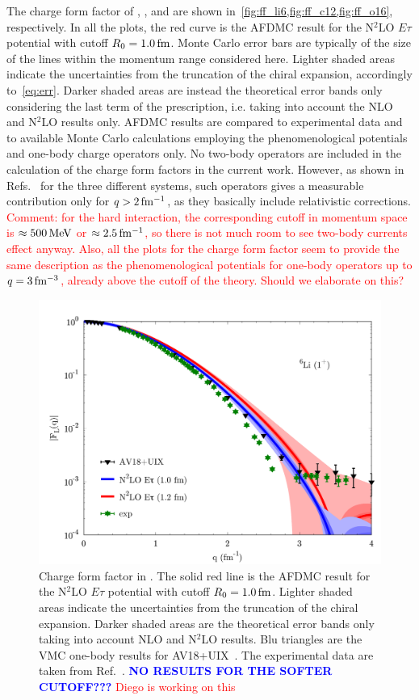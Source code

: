 \documentclass[aps,prc,twocolumn,superscriptaddress,showpacs,floatfix,nofootinbib]{revtex4-1}
\newcommand{\red}[1]{\protect\textcolor{red}{#1}}
\newcommand{\blue}[1]{\protect\textcolor{blue}{#1}}
\begin{document}
The charge form factor of , , and  are shown 
in~\cref{fig:ff_li6,fig:ff_c12,fig:ff_o16}, respectively. In all the plots, the red curve
is the AFDMC result for the N$^2$LO $E\tau$ potential with cutoff $R_0=1.0\,\rm fm$.
Monte Carlo error bars are typically of the size of the lines within the momentum 
range considered here. Lighter shaded areas indicate the uncertainties from 
the truncation of the chiral expansion, accordingly to~\cref{eq:err}.
Darker shaded areas are instead the theoretical error bands only considering the last
term of the prescription, i.e. taking into account the NLO and N$^2$LO results only.
AFDMC results are compared to experimental data and to available Monte
Carlo calculations employing the phenomenological potentials and one-body charge operators only.
No two-body operators are included in the calculation of the charge form factors in the 
current work. However, as shown in Refs.~\cite{Wiringa:1998,Lovato:2013,Mihaila:2000} for the three
different systems, such operators gives a measurable contribution only 
for $q>2\,\rm fm^{-1}$, as they basically include relativistic corrections.
\red{Comment: for the hard interaction, the corresponding cutoff in momentum space is 
$\approx 500\,\rm MeV$ or $\approx2.5\,\rm fm^{-1}$, so there is not much room to see 
two-body currents effect anyway. Also, all the plots for the charge form factor seem to provide 
the same description as the phenomenological potentials for one-body operators up to
$q=3\,\rm fm^{-3}$, already above the cutoff of the theory. Should we elaborate on this?}

\begin{figure}[htb]
\includegraphics[width=\linewidth]{ff_li6.pdf}
\caption[]{Charge form factor in . The solid red line is the AFDMC result for the
N$^2$LO $E\tau$ potential with cutoff $R_0=1.0\,\rm fm$.
Lighter shaded areas indicate the uncertainties from the truncation of the chiral expansion.
Darker shaded areas are the theoretical error bands only taking into account NLO and N$^2$LO results. 
Blu triangles are the VMC one-body results for AV18+UIX~\cite{Wiringa:1998}.
The experimental data are taken from Ref.~\cite{Li:1971}.
\blue{\bf NO RESULTS FOR THE SOFTER CUTOFF???}
\red{Diego is working on this}}
\label{fig:ff_li6}
\end{figure}
\end{document}
